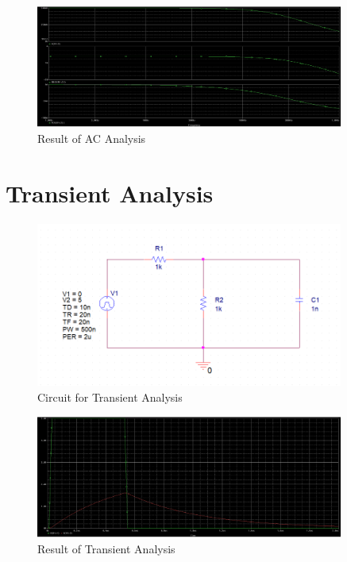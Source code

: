 \documentclass[12pt]{../manual}
\begin{document}
\begin{figure}[ht!]
\begin{center}
\includegraphics[width=0.9\textwidth]{figures/ResultACAnalysisCrop.PNG}
\caption{Result of AC Analysis}
\label{fig:acAnalRes}
\end{center}
\end{figure}

\newpage
\section{Transient Analysis}
\begin{figure}[ht!]
\begin{center}
\includegraphics[width=0.9\textwidth]{figures/TransientAnalysisCircuitCrop.PNG}
\caption{Circuit for Transient Analysis}
\label{fig:trans}
\end{center}
\end{figure}

\begin{figure}[ht!]
\begin{center}
\includegraphics[width=0.9\textwidth]{figures/ResultTransientAnalysisCrop.PNG}
\caption{Result of Transient Analysis}
\label{fig:transAnalRes}
\end{center}
\end{figure}
\end{document}
